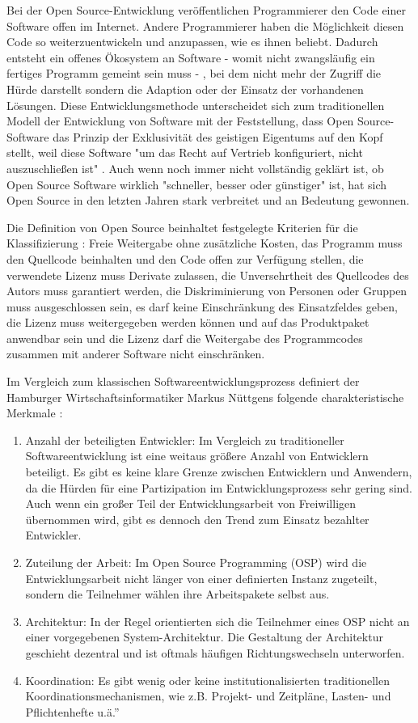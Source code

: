 Bei der Open Source-Entwicklung veröffentlichen Programmierer den Code einer Software offen im Internet. Andere Programmierer haben die Möglichkeit diesen Code so weiterzuentwickeln und anzupassen, wie es ihnen beliebt. Dadurch entsteht ein offenes Ökosystem an Software - womit nicht zwangsläufig ein fertiges Programm gemeint sein muss - , bei dem nicht mehr der Zugriff die Hürde darstellt sondern die Adaption oder der Einsatz der vorhandenen Lösungen. Diese Entwicklungsmethode unterscheidet sich zum traditionellen Modell der Entwicklung von Software mit der Feststellung, dass Open Source-Software das Prinzip der Exklusivität des geistigen Eigentums auf den Kopf stellt, weil diese Software "um das Recht auf Vertrieb konfiguriert, nicht auszuschließen ist" \cite{suchen}. Auch wenn noch immer nicht vollständig geklärt ist, ob Open Source Software wirklich "schneller, besser oder günstiger" ist, hat sich Open Source in den letzten Jahren stark verbreitet \cite{Lerner_2001} und an Bedeutung gewonnen.

Die Definition von Open Source beinhaltet festgelegte Kriterien für die Klassifizierung \cite{osd_2003}: Freie Weitergabe ohne zusätzliche Kosten, das Programm muss den Quellcode beinhalten und den Code offen zur Verfügung stellen, die verwendete Lizenz muss Derivate zulassen, die Unversehrtheit des Quellcodes des Autors muss garantiert werden, die Diskriminierung von Personen oder Gruppen muss ausgeschlossen sein, es darf keine Einschränkung des Einsatzfeldes geben, die Lizenz muss weitergegeben werden können und auf das Produktpaket anwendbar sein und die Lizenz darf die Weitergabe des Programmcodes zusammen mit anderer Software nicht einschränken.

Im Vergleich zum klassischen Softwareentwicklungsprozess definiert der Hamburger Wirtschaftsinformatiker Markus Nüttgens folgende charakteristische Merkmale \cite{nuttgens_2014}:
\begin{enumerate}
\item Anzahl der beteiligten Entwickler: Im Vergleich zu traditioneller Softwareentwicklung ist eine weitaus größere Anzahl von Entwicklern beteiligt. Es gibt es keine klare Grenze zwischen Entwicklern und Anwendern, da die Hürden für eine Partizipation im Entwicklungsprozess sehr gering sind. Auch wenn ein großer Teil der Entwicklungsarbeit von Freiwilligen übernommen wird, gibt es dennoch den Trend zum Einsatz bezahlter Entwickler.
\item Zuteilung der Arbeit: Im Open Source Programming (OSP) wird die Entwicklungsarbeit nicht länger von einer definierten Instanz zugeteilt, sondern die Teilnehmer wählen ihre Arbeitspakete selbst aus.
\item Architektur: In der Regel orientierten sich die Teilnehmer eines OSP nicht an einer vorgegebenen System-Architektur. Die Gestaltung der Architektur geschieht dezentral und ist oftmals häufigen Richtungswechseln unterworfen.
\item Koordination: Es gibt wenig oder keine institutionalisierten traditionellen Koordinationsmechanismen, wie z.B. Projekt- und Zeitpläne, Lasten- und Pflichtenhefte u.ä.” \cite{suchen}
\end{enumerate}

